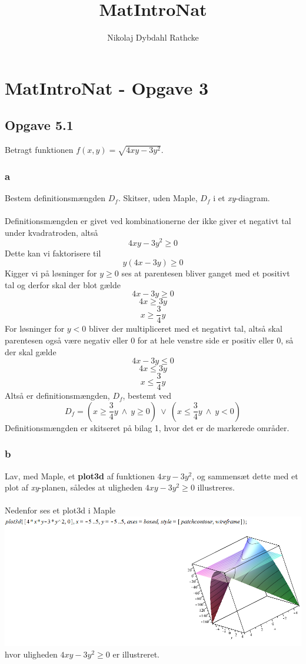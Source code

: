 \documentclass[12pt]{article}
\title{MatIntroNat}
\author{Nikolaj Dybdahl Rathcke}
\begin{document}
\section*{MatIntroNat - Opgave 3}

\subsection*{Opgave 5.1}
Betragt funktionen $f(x,y)=\sqrt{4xy-3y^2}$.\\

\subsubsection*{a}
Bestem definitionsmængden $D_f$. Skitser, uden Maple, $D_f$ i et \textit{xy}-diagram.\\
\\
Definitionsmængden er givet ved kombinationerne der ikke giver et negativt tal under kvadratroden, altså
$$4xy-3y^2\geq 0$$
Dette kan vi faktorisere til
$$y(4x-3y)\geq 0$$
Kigger vi på løsninger for $y\geq 0$ ses at parentesen bliver ganget med et positivt tal og derfor skal der blot gælde
$$4x-3y\geq 0$$
$$4x\geq 3y$$
$$x\geq \frac{3}{4}y$$
For løsninger for $y<0$ bliver der multipliceret med et negativt tal, altså skal parentesen også være negativ eller 0 for at hele venstre side er positiv eller 0, så der skal gælde
$$4x-3y\leq 0$$
$$4x\leq 3y$$
$$x\leq \frac{3}{4}y$$
Altså er definitionsmængden, $D_f$, bestemt ved
$$D_f=(x\geq \frac{3}{4}y\:\wedge\:y\geq 0)\:\vee\:(x\leq \frac{3}{4}y\:\wedge\:y<0)$$
Definitionsmængden er skitseret på bilag 1, hvor det er de markerede områder.

\subsubsection*{b}
Lav, med Maple, et \textbf{plot3d} af funktionen $4xy-3y^2$, og sammensæt dette med et plot af \textit{xy}-planen, således at uligheden $4xy-3y^2\geq 0$ illustreres.\\
\\
Nedenfor ses et plot3d i Maple\\
\includegraphics[scale=0.6]{Pic2}\\
hvor uligheden $4xy-3y^2\geq 0$ er illustreret.
\end{document}
